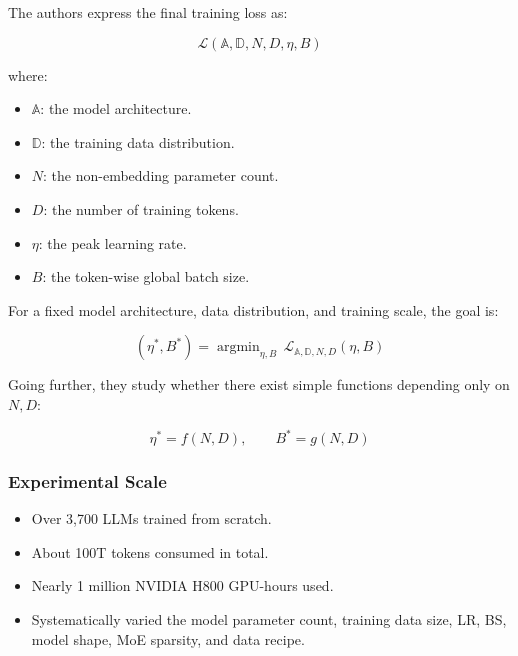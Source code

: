 \documentclass[
  english,
  11pt,
  a4paper,
]{article}
\providecommand{\tightlist}{%
  \setlength{\itemsep}{0pt}\setlength{\parskip}{0pt}}
\newenvironment{NotesFormula}{%
  \par\noindent\begin{minipage}{\linewidth}%
  \setlength{\parindent}{2em}%
  \setlength{\parskip}{0.35em}%
}{\end{minipage}\par}
\begin{document}
\begin{NotesFormula}

The authors express the final training loss as:

\[\mathcal L(\mathbb A,\mathbb D,N,D,\eta,B)\]

\end{NotesFormula}

where:

\begin{itemize}
\tightlist
\item
  \(\mathbb A\): the model architecture.
\item
  \(\mathbb D\): the training data distribution.
\item
  \(N\): the non-embedding parameter count.
\item
  \(D\): the number of training tokens.
\item
  \(\eta\): the peak learning rate.
\item
  \(B\): the token-wise global batch size.
\end{itemize}

\begin{NotesFormula}

For a fixed model architecture, data distribution, and training scale,
the goal is:

\[(\eta^*,B^*)=\mathop{\arg\min}_{\eta,B}\,\mathcal L_{\mathbb A,\mathbb D,N,D}(\eta,B)\]

\end{NotesFormula}

\begin{NotesFormula}

Going further, they study whether there exist simple functions depending
only on \(N,D\):

\[\boxed{\eta^*=f(N,D),\qquad B^*=g(N,D)}\]

\end{NotesFormula}

\subsubsection{Experimental Scale}\label{experimental-scale}

\begin{itemize}
\tightlist
\item
  Over 3,700 LLMs trained from scratch.
\item
  About 100T tokens consumed in total.
\item
  Nearly 1 million NVIDIA H800 GPU-hours used.
\item
  Systematically varied the model parameter count, training data size,
  LR, BS, model shape, MoE sparsity, and data recipe.
\end{itemize}
\end{document}
